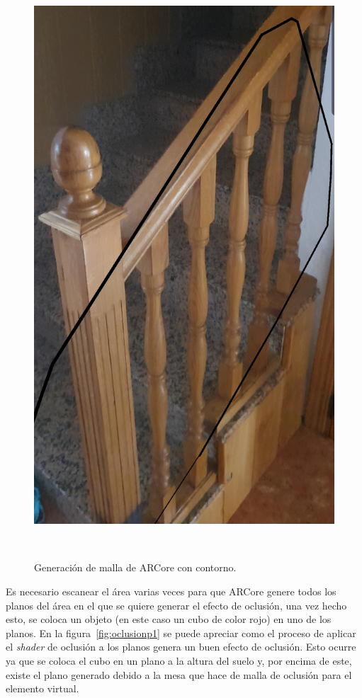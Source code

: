 \begin{figure}[H]
\begin{minipage}{0.5\textwidth}
        \includegraphics[scale=0.12]{Images/Shaders/oclusion (2).jpg}\\
    \end{minipage}\\
    \caption[Generación de malla de ARCore con contorno]{Generación de malla de ARCore con contorno.}
    \label{fig:mallaARCoreoclusion}
\end{figure}

Es necesario escanear el área varias veces para que ARCore genere todos los planos del área en el que se quiere generar el efecto de oclusión, una vez hecho esto, se coloca un objeto (en este caso un cubo de color rojo) en uno de los planos. En la figura~\ref{fig:oclusionp1} se puede apreciar como el proceso de aplicar el \textit{shader} de oclusión a los planos genera un buen efecto de oclusión. Esto ocurre ya que se coloca el cubo en un plano a la altura del suelo y, por encima de este, existe el plano generado debido a la mesa que hace de malla de oclusión para el elemento virtual. 

